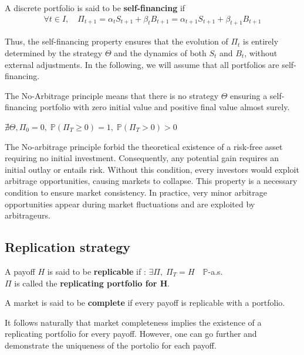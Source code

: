 \bigskip

\begin{definitionbox}[frametitle = {Self-financing property}]
    A discrete portfolio is said to be \textbf{self-financing} if
    \begin{align*}
        \forall t \in I,  \quad \Pi_{t+1} = \alpha_t S_{t+1} + \beta_tB_{t+1} = \alpha_{t+1}S_{t+1} + \beta_{t+1}B_{t+1} 
    \end{align*}\cite{SelfFinancingPortfolio}
\end{definitionbox}

\bigskip

Thus, the self-financing property ensures that the evolution of $\Pi_t$ is entirely determined by the strategy $\Theta$ and the dynamics of both $S_t$ and $B_t$, without external adjustments.
In the following, we will assume that all portfolios are self-financing.

\bigskip

\begin{definitionbox}[frametitle = {No-Arbitrage Principle}]
    The No-Arbitrage principle means that there is no strategy $\Theta$ ensuring a self-financing portfolio with zero initial value and positive final value almost surely.
    \begin{center}
         $\nexists \Theta, \Pi_0=0, \; \mathbb{P}(\Pi_T\geq0)=1, \; \mathbb{P}(\Pi_T > 0) > 0$
    \end{center}
\end{definitionbox}
\bigskip



\pagebreak

\remark The No-arbitrage principle forbid the theoretical existence of a risk-free asset requiring no initial investment.
Consequently, any potential gain requires an initial outlay or entails risk.
Without this condition, every investors would exploit arbitrage opportunities, causing markets to collapse.
This property is a necessary condition to ensure market consistency.
In practice, very minor arbitrage opportunities appear during market fluctuations and are exploited by arbitrageurs. \cite{Arbitrageurs}

\subsection{Replication strategy}
\bigskip
\begin{definitionbox}[frametitle = {Replication}]
    A payoff $H$ is said to be \textbf{replicable} if : $\exists \Pi, \; \Pi_T=H \quad \mathbb{P}$-a.s. \\
    $\Pi$ is called the \textbf{replicating portfolio for H}.
\end{definitionbox}
\bigskip
\begin{definitionbox}[frametitle = {Market Completeness}]
    A market is said to be \textbf{complete} if every payoff is replicable with a portfolio.
\end{definitionbox}
\bigskip
\remark 
It follows naturally that market completeness implies the existence of a replicating portfolio for every payoff.
However, one can go further and demonstrate the uniqueness of the portolio for each payoff.

